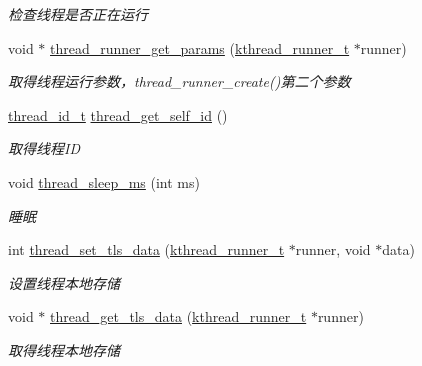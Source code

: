 \begin{DoxyCompactItemize}
\begin{DoxyCompactList}\small\item\em 检查线程是否正在运行 \end{DoxyCompactList}\item 
void $\ast$ \hyperlink{a00138_ga2126b5da850ec506d0909eb81f9a50dc_ga2126b5da850ec506d0909eb81f9a50dc}{thread\+\_\+runner\+\_\+get\+\_\+params} (\hyperlink{a00066_a4f78c259c9527c821f1a6f87495dd339_a4f78c259c9527c821f1a6f87495dd339}{kthread\+\_\+runner\+\_\+t} $\ast$runner)
\begin{DoxyCompactList}\small\item\em 取得线程运行参数，thread\+\_\+runner\+\_\+create()第二个参数 \end{DoxyCompactList}\item 
\hyperlink{a00066_ad0ada5642d10ce71bdd90816182f9b79_ad0ada5642d10ce71bdd90816182f9b79}{thread\+\_\+id\+\_\+t} \hyperlink{a00138_gaecf10907eee00ec0e807271c906a6645_gaecf10907eee00ec0e807271c906a6645}{thread\+\_\+get\+\_\+self\+\_\+id} ()
\begin{DoxyCompactList}\small\item\em 取得线程\+I\+D \end{DoxyCompactList}\item 
void \hyperlink{a00138_gabddf3ac30aac3f22f8c53b7517e6eb35_gabddf3ac30aac3f22f8c53b7517e6eb35}{thread\+\_\+sleep\+\_\+ms} (int ms)
\begin{DoxyCompactList}\small\item\em 睡眠 \end{DoxyCompactList}\item 
int \hyperlink{a00138_ga76839139180a3f0d0b017a5f39801936_ga76839139180a3f0d0b017a5f39801936}{thread\+\_\+set\+\_\+tls\+\_\+data} (\hyperlink{a00066_a4f78c259c9527c821f1a6f87495dd339_a4f78c259c9527c821f1a6f87495dd339}{kthread\+\_\+runner\+\_\+t} $\ast$runner, void $\ast$data)
\begin{DoxyCompactList}\small\item\em 设置线程本地存储 \end{DoxyCompactList}\item 
void $\ast$ \hyperlink{a00138_gaf5bb2dd001c42fdbdcdcb2048f76ae89_gaf5bb2dd001c42fdbdcdcb2048f76ae89}{thread\+\_\+get\+\_\+tls\+\_\+data} (\hyperlink{a00066_a4f78c259c9527c821f1a6f87495dd339_a4f78c259c9527c821f1a6f87495dd339}{kthread\+\_\+runner\+\_\+t} $\ast$runner)
\begin{DoxyCompactList}\small\item\em 取得线程本地存储 \end{DoxyCompactList}\item 

\end{DoxyCompactItemize}
